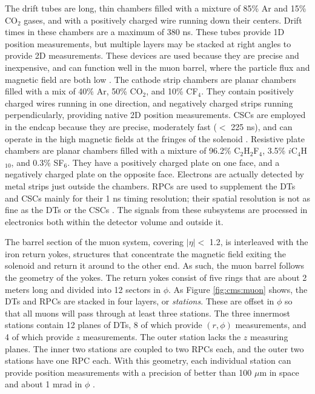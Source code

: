 The drift tubes are long, thin chambers filled with a mixture of 85\%
Ar and 15\% CO$_2$ gases, and with a positively charged wire running
down their centers. Drift times in these chambers are a maximum of 380
ns. These tubes provide 1D position measurements, but multiple layers
may be stacked at right angles to
provide 2D measurements. These devices are used because they are precise
and inexpensive, and can function well in the muon barrel, where the
particle flux and magnetic field are both low
\cite{accelexper,websitedt}. The cathode strip chambers are planar
chambers filled with a mix of 40\% Ar, 50\% CO$_2$, and 10\%
CF$_4$. They contain positively charged wires running in
one direction, and negatively charged strips running perpendicularly,
providing native 2D position measurements. CSCs are employed in the
endcap because they are precise, moderately fast ($<$ 225 ns), and can operate
in the high magnetic fields at the fringes of the solenoid
\cite{accelexper,websitecsc}. Resistive plate chambers are planar
chambers filled with a mixture of 96.2\% C$_2$H$_2$F$_4$, 3.5\%
$i$C$_4$H$_{10}$, and 0.3\% SF$_6$. They have a positively charged
plate on one face, and a negatively charged plate on the
opposite face. Electrons are actually detected by metal strips just outside
the chambers. RPCs are used to supplement the DTs and CSCs
mainly for their 1 ns timing resolution; their spatial
resolution is not as fine as the DTs or the CSCs
\cite{accelexper,websiterpc}. The signals from these subsystems are
processed in electronics both within the detector volume and outside it.

The barrel section of the muon system, covering $|\eta| <$ 1.2, is
interleaved with the iron return yokes, structures that concentrate
the magnetic field exiting the solenoid and return it around to the
other end. As such, the muon barrel follows the geometry of the
yokes. The return yokes consist of five rings that are about 2 meters long
and divided into 12 sectors in $\phi$. As Figure \ref{fig:cms:muon} shows,
the DTs and RPCs are stacked in four layers, or \emph{stations}. These
are offset in $\phi$ so that all muons will pass through at least
three stations. The three innermost stations contain 12 planes of DTs, 8 of
which provide $(r,\phi)$ measurements, and 4 of which provide $z$
measurements. The outer station lacks the $z$ measuring planes. The
inner two stations are coupled to two RPCs each, and the outer two
stations have one RPC each. With this geometry, each individual
station can provide position measurements with a precision of better
than 100 $\mu$m in space and about 1 mrad in $\phi$ \cite{tdr}.

